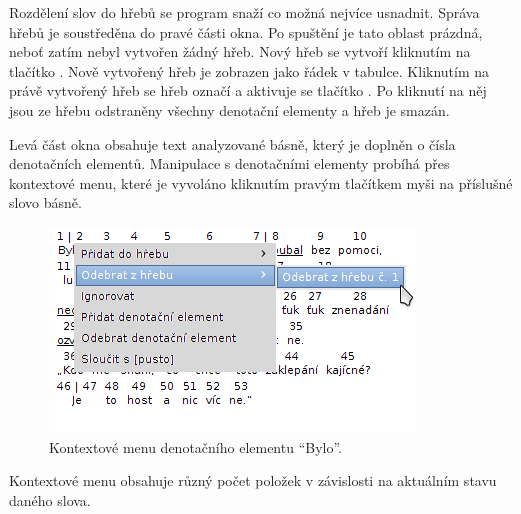 \documentclass[dp.tex]{subfiles}
\begin{document}
Rozdělení slov do hřebů se program snaží co možná nejvíce usnadnit. Správa hřebů je soustředěna do pravé části okna. Po spuštění je tato oblast prázdná, neboť zatím nebyl vytvořen žádný hřeb. Nový hřeb se vytvoří kliknutím na tlačítko . Nově vytvořený hřeb je zobrazen jako řádek v tabulce. Kliknutím na právě vytvořený hřeb se hřeb označí a aktivuje se tlačítko . Po kliknutí na něj jsou ze hřebu odstraněny všechny denotační elementy a hřeb je smazán.

Levá část okna obsahuje text analyzované básně, který je doplněn o čísla denotačních elementů. Manipulace s denotačními elementy probíhá přes kontextové menu, které je vyvoláno kliknutím pravým tlačítkem myši na příslušné slovo básně.

\begin{figure}[H]
\centering
\includegraphics[max width=\textwidth,keepaspectratio=true]{imgs-60-aplikace/gui-denotation-element-menu}
\caption{Kontextové menu denotačního elementu \enquote{Bylo}.}
\label{fig:gui-denotation-menu}
\end{figure}

Kontextové menu obsahuje různý počet položek v závislosti na aktuálním stavu daného slova. 
\end{document}
